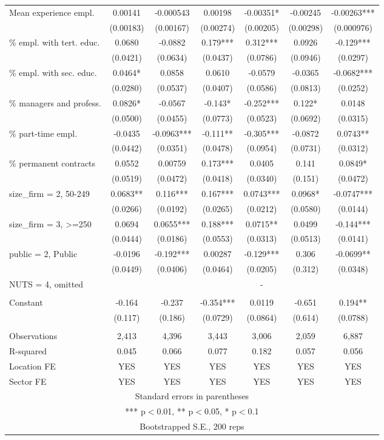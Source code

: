 \documentclass[]{article}
\begin{document}
\begin{tabular}{lcccccc}
Mean experience empl. & 0.00141 & -0.000543 & 0.00198 & -0.00351* & -0.00245 & -0.00263*** \\
 & (0.00183) & (0.00167) & (0.00274) & (0.00205) & (0.00298) & (0.000976) \\
\% empl. with tert. educ. & 0.0680 & -0.0882 & 0.179*** & 0.312*** & 0.0926 & -0.129*** \\
 & (0.0421) & (0.0634) & (0.0437) & (0.0786) & (0.0946) & (0.0297) \\
\% empl. with sec. educ. & 0.0464* & 0.0858 & 0.0610 & -0.0579 & -0.0365 & -0.0682*** \\
 & (0.0280) & (0.0537) & (0.0407) & (0.0586) & (0.0813) & (0.0252) \\
\% managers and profess. & 0.0826* & -0.0567 & -0.143* & -0.252*** & 0.122* & 0.0148 \\
 & (0.0500) & (0.0455) & (0.0773) & (0.0523) & (0.0692) & (0.0315) \\
\% part-time empl. & -0.0435 & -0.0963*** & -0.111** & -0.305*** & -0.0872 & 0.0743** \\
 & (0.0442) & (0.0351) & (0.0478) & (0.0954) & (0.0731) & (0.0312) \\
\% permanent contracts & 0.0552 & 0.00759 & 0.173*** & 0.0405 & 0.141 & 0.0849* \\
 & (0.0519) & (0.0472) & (0.0418) & (0.0340) & (0.151) & (0.0472) \\
size\_firm = 2, 50-249 & 0.0683** & 0.116*** & 0.167*** & 0.0743*** & 0.0968* & -0.0747*** \\
 & (0.0266) & (0.0192) & (0.0265) & (0.0212) & (0.0580) & (0.0144) \\
size\_firm = 3, >=250 & 0.0694 & 0.0655*** & 0.188*** & 0.0715** & 0.0499 & -0.144*** \\
 & (0.0444) & (0.0186) & (0.0553) & (0.0313) & (0.0513) & (0.0141) \\
public = 2, Public & -0.0196 & -0.192*** & 0.00287 & -0.129*** & 0.306 & -0.0699** \\
 & (0.0449) & (0.0406) & (0.0464) & (0.0205) & (0.312) & (0.0348) \\
NUTS = 4, omitted &  &  &  & - &  &  \\
 &  &  &  &  &  &  \\
Constant & -0.164 & -0.237 & -0.354*** & 0.0119 & -0.651 & 0.194** \\
 & (0.117) & (0.186) & (0.0729) & (0.0864) & (0.614) & (0.0788) \\
 &  &  &  &  &  &  \\
Observations & 2,413 & 4,396 & 3,443 & 3,006 & 2,059 & 6,887 \\
R-squared & 0.045 & 0.066 & 0.077 & 0.182 & 0.057 & 0.056 \\
Location FE & YES & YES & YES & YES & YES & YES \\
 Sector FE & YES & YES & YES & YES & YES & YES \\ \hline
\multicolumn{7}{c}{ Standard errors in parentheses} \\
\multicolumn{7}{c}{ *** p$<$0.01, ** p$<$0.05, * p$<$0.1} \\
\multicolumn{7}{c}{ Bootstrapped S.E., 200 reps} \\
\end{tabular}
\end{document}
